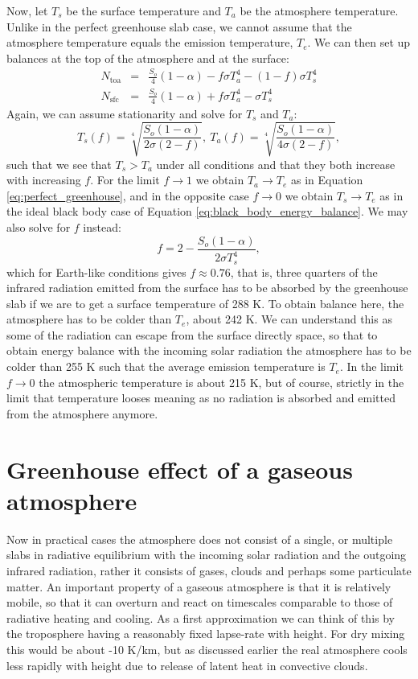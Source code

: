 \documentclass[12pt]{book}
\begin{document}
Now, let $T_s$ be the surface temperature and $T_a$ be the atmosphere temperature. Unlike in the perfect greenhouse slab case, we cannot assume that the atmosphere temperature equals the emission temperature, $T_e$. We can then set up balances at the top of the atmosphere and at the surface:
\begin{eqnarray}
N_\textrm{toa} &=&  \frac{S_o}{4}(1-\alpha) - f \sigma T_a^4 - (1-f)\sigma T_s^4 \nonumber \\ 
N_\textrm{sfc} &=&  \frac{S_o}{4}(1-\alpha) + f \sigma T_a^4 - \sigma T_s^4 \nonumber 
\end{eqnarray}
Again, we can assume stationarity and solve for $T_s$ and $T_a$:
\begin{equation}
T_s(f) = \sqrt[4]{\frac{S_o(1-\alpha)}{2\sigma(2-f)}}, \ T_a(f) =  \sqrt[4]{\frac{S_o(1-\alpha)}{4\sigma(2-f)}},
\label{eq:partial_absorbtion_solution}
\end{equation}
such that we see that $T_s > T_a$ under all conditions and that they both increase with increasing $f$. For the limit $f \rightarrow 1$ we obtain $T_a \rightarrow T_e$ as in Equation \ref{eq:perfect_greenhouse}, and in the opposite case $f \rightarrow 0$ we obtain $T_s \rightarrow T_e$ as in the ideal black body case of Equation \ref{eq:black_body_energy_balance}. We may also solve for $f$ instead:
\begin{equation}
f = 2 - \frac{S_o(1-\alpha)}{2\sigma T_s^4},
\end{equation}
which for Earth-like conditions gives $f \approx 0.76$, that is, three quarters of the infrared radiation emitted from the surface has to be absorbed by the greenhouse slab if we are to get a surface temperature of 288 K. To obtain balance here, the atmosphere has to be colder than $T_e$, about 242 K. We can understand this as some of the radiation can escape from the surface directly space, so that to obtain energy balance with the incoming solar radiation the atmosphere has to be colder than 255 K such that the average emission temperature is $T_e$. In the limit $f \rightarrow 0$ the atmospheric temperature is about 215 K, but of course, strictly in the limit that temperature looses meaning as no radiation is absorbed and emitted from the atmosphere anymore.


\section{Greenhouse effect of a gaseous atmosphere}
Now in practical cases the atmosphere does not consist of a single, or multiple slabs in radiative equilibrium with the incoming solar radiation and the outgoing infrared radiation, rather it consists of gases, clouds and perhaps some particulate matter. An important property of a gaseous atmosphere is that it is relatively mobile, so that it can overturn and react on timescales comparable to those of radiative heating and cooling. As a first approximation we can think of this by the troposphere having a reasonably fixed lapse-rate with height. For dry mixing this would be about -10 K/km, but as discussed earlier the real atmosphere cools less rapidly with height due to release of latent heat in convective clouds.
\end{document}
